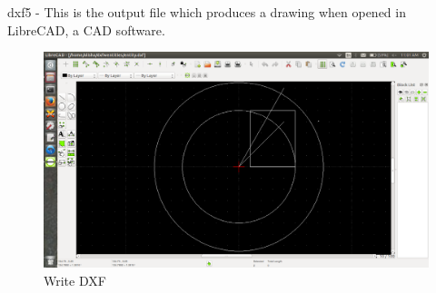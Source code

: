 dxf5 - This is the output file which produces a drawing when opened in LibreCAD, a CAD software.
\begin{figure} [h!]
\centering
\includegraphics[scale=0.2]{images/dxf5.png}
\caption{Write DXF }
\end{figure}


